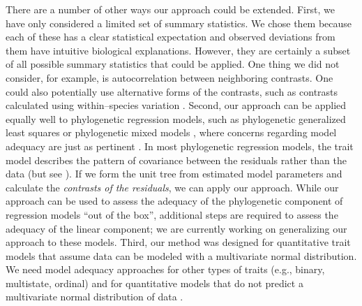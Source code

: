 \documentclass[a4paper,12pt]{article}
\begin{document}
There are a number of other ways our approach could be extended. First, we have only considered a limited set of summary statistics. We chose them because each of these has a clear statistical expectation and observed deviations from them have intuitive biological explanations. However, they are certainly a subset of all possible summary statistics that could be applied. One thing we did not consider, for example, is autocorrelation between neighboring contrasts. One could also potentially use alternative forms of the contrasts, such as contrasts calculated using within--species variation \citep{Felsenstein2008}. Second, our approach can be applied equally well to phylogenetic regression models, such as phylogenetic generalized least squares \citep{Grafen1989} or phylogenetic mixed models \citep{Lynch1991, Hadfield2010}, where concerns regarding model adequacy are just as pertinent \citep{Hansen2012}. In most phylogenetic regression models, the trait model describes the pattern of covariance between the residuals rather than the data \citep{Rohlf2001, Rohlf2006} (but see \citep{Hansen2008}). If we form the unit tree from estimated model parameters and calculate the \emph{contrasts of the residuals}, we can apply our approach. While our approach can be used to assess the adequacy of the phylogenetic component of regression models ``out of the box'', additional steps are required to assess the adequacy of the linear component; we are currently working on generalizing our approach to these models. Third, our method was designed for quantitative trait models that assume data can be modeled with a multivariate normal distribution. We need model adequacy approaches for other types of traits (e.g., binary, multistate, ordinal) and for quantitative models that do not predict a multivariate normal distribution of data \citep{Landis2012}.
\end{document}
